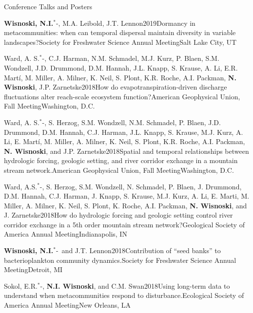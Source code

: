 \documentclass{resume} %
\newcommand{\Star}{\ensuremath{^*}\kern-\scriptspace}
\begin{document}
\begin{rhangSection}{Conference Talks and Posters}
   \begin{Presentation}{{\bf Wisnoski, N.I.}\Star, M.A. Leibold, J.T. Lennon}{2019}{Dormancy in metacommunities: when can temporal dispersal maintain diversity in variable landscapes?}{Society for Freshwater Science Annual Meeting}{Salt Lake City, UT}
  \end{Presentation}
  
  \begin{Presentation}{Ward, A. S.\Star, C.J. Harman, N.M. Schmadel, M.J. Kurz, P. Blaen, S.M. Wondzell, J.D. Drummond, D.M. Hannah, J.L. Knapp, S. Krause, A. Li, E.R. Martí, M. Miller, A. Milner, K. Neil, S. Plont, K.R. Roche, A.I. Packman, {\bf N. Wisnoski}, J.P. Zarnetske}{2018}{How do evapotranspiration-driven discharge fluctuations alter reach-scale ecosystem function?}{American Geophysical Union, Fall Meeting}{Washington, D.C.}
  \end{Presentation}
  
   \begin{Presentation}{Ward, A. S.\Star, S. Herzog, S.M. Wondzell, N.M. Schmadel, P. Blaen, J.D. Drummond, D.M. Hannah, C.J. Harman, J.L. Knapp, S. Krause, M.J. Kurz, A. Li, E. Martí, M. Miller, A. Milner, K. Neil, S. Plont, K.R. Roche, A.I. Packman, {\bf N. Wisnoski}, and J.P. Zarnetske}{2018}{Spatial and temporal relationships between hydrologic forcing, geologic setting, and river corridor exchange in a mountain stream network.}{American Geophysical Union, Fall Meeting}{Washington, D.C.}
  \end{Presentation}
  
  \begin{Presentation}{Ward, A.S.\Star, S. Herzog, S.M. Wondzell, N. Schmadel, P. Blaen, J. Drummond, D.M. Hannah, C.J. Harman, J. Knapp, S. Krause, M.J. Kurz, A. Li, E. Marti, M. Miller, A. Milner, K. Neil, S. Plont, K. Roche, A.I. Packman, {\bf N. Wisnoski}, and J. Zarnetske}{2018}{How do hydrologic forcing and geologic setting control river corridor exchange in a 5th order mountain stream network?}{Geological Society of America Annual Meeting}{Indianapolis, IN}
  \end{Presentation}
  
  \begin{Presentation}{{\bf Wisnoski, N.I.}\Star\ and J.T. Lennon}{2018}{Contribution of \enquote{seed banks} to bacterioplankton community dynamics.}{Society for Freshwater Science Annual Meeting}{Detroit, MI}
  \end{Presentation}
  
  \begin{Presentation}{Sokol, E.R.\Star, {\bf N.I. Wisnoski}, and C.M. Swan}{2018}{Using long-term data to understand when metacommunities respond to disturbance.}{Ecological Society of America Annual Meeting}{New Orleans, LA}
  \end{Presentation}


\end{rhangSection}
\end{document}
